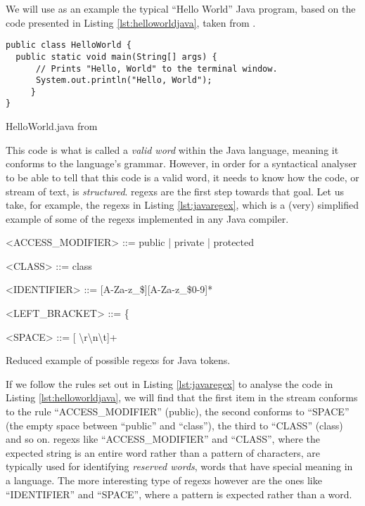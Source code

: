 We will use as an example the typical ``Hello World'' Java program, based on the code presented in Listing \ref{lst:helloworldjava}, taken from \cite{SEDGEWICK:2011}.

\begin{listing}
\begin{verbatim}
public class HelloWorld {
  public static void main(String[] args) {
      // Prints "Hello, World" to the terminal window.
      System.out.println("Hello, World");
     }
}
\end{verbatim}
\caption{HelloWorld.java from \cite{SEDGEWICK:2011}} \label{lst:helloworldjava}
\end{listing}

This code is what is called a \emph{valid word} within the Java language, meaning it conforms to the language's \gls{grammar}. However, in order for a syntactical analyser to be able to tell that this code is a valid word, it needs to know how the code, or stream of text, is \emph{structured}. \Gls{regex}s are the first step towards that goal. Let us take, for example, the \gls{regex}s in Listing \ref{lst:javaregex}, which is a (very) simplified example of some of the \gls{regex}s implemented in any Java compiler.

\begin{listing}
\begin{grammar}
<ACCESS_MODIFIER> ::= public | private | protected

<CLASS> ::= class

<IDENTIFIER> ::= [A-Za-z_\$][A-Za-z_\$0-9]*

<LEFT_BRACKET> ::= \{

<SPACE> ::= [ \textbackslash r\textbackslash n\textbackslash t]+
\end{grammar}
\caption{Reduced example of possible \gls{regex}s for Java tokens.} \label{lst:javaregex}
\end{listing}

If we follow the rules set out in Listing \ref{lst:javaregex} to analyse the code in Listing \ref{lst:helloworldjava}, we will find that the first item in the stream conforms to the rule ``ACCESS_MODIFIER'' (public), the second conforms to ``SPACE'' (the empty space between ``public'' and ``class''), the third to ``CLASS'' (class) and so on. \Gls{regex}s like ``ACCESS_MODIFIER'' and ``CLASS'', where the expected string is an entire word rather than a pattern of characters, are typically used for identifying \emph{reserved words}, words that have special meaning in a language. The more interesting type of \gls{regex}s however are the ones like ``IDENTIFIER'' and ``SPACE'', where a pattern is expected rather than a word.

